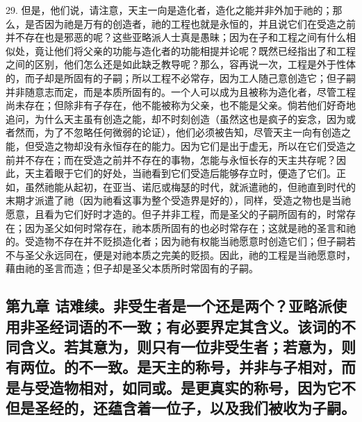 29. 但是，他们说，请注意，天主一向是造化者，造化之能并非外加于祂的；那么，是否因为祂是万有的创造者，祂的工程也就是永恒的，并且说它们在受造之前并不存在也是邪恶的呢？这些亚略派人士真是愚昧；因为在子和工程之间有什么相似处，竟让他们将父亲的功能与造化者的功能相提并论呢？既然已经指出了和工程之间的区别，他们怎么还是如此缺乏教导呢？那么，容再说一次，工程是外于性体的，而子却是所固有的子嗣；所以工程不必常存，因为工人随己意创造它；但子嗣并非随意志而定，而是本质所固有的。一个人可以成为且被称为造化者，尽管工程尚未存在；但除非有子存在，他不能被称为父亲，也不能是父亲。倘若他们好奇地追问，为什么天主虽有创造之能，却不时刻创造（虽然这也是疯子的妄念，因为或者然而，为了不忽略任何微弱的论证），他们必须被告知，尽管天主一向有创造之能，但受造之物却没有永恒存在的能力。因为它们是出于虚无，所以在它们受造之前并不存在；而在受造之前并不存在的事物，怎能与永恒长存的天主共存呢？因此，天主着眼于它们的好处，当祂看到它们受造后能够存立时，便造了它们。正如，虽然祂能从起初，在亚当、诺厄或梅瑟的时代，就派遣祂的，但祂直到时代的末期才派遣了祂（因为祂看这事为整个受造界是好的），同样，受造之物也是当祂愿意，且看为它们好时才造的。但子并非工程，而是圣父的子嗣所固有的，时常存在；因为圣父如何时常存在，祂本质所固有的也必时常存在；这就是祂的圣言和祂的。受造物不存在并不贬损造化者；因为祂有权能当祂愿意时创造它们；但子嗣若不与圣父永远同在，便是对祂本质之完美的贬损。因此，祂的工程是当祂愿意时，藉由祂的圣言而造；但子却是圣父本质所时常固有的子嗣。\par


\subsection{第九章 诘难续。非受生者是一个还是两个？亚略派使用非圣经词语的不一致；有必要界定其含义。该词的不同含义。若其意为，则只有一位非受生者；若意为，则有两位。的不一致。是天主的称号，并非与子相对，而是与受造物相对，如同或。是更真实的称号，因为它不但是圣经的，还蕴含着一位子，以及我们被收为子嗣。}

